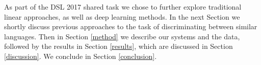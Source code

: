 
As part of the DSL 2017 shared task we chose to further explore traditional linear approaches, as well as deep learning methods. In the next Section we shortly discuss previous approaches to the task of discriminating between similar languages. Then in Section \ref{method} we describe our systems and the data, followed by the results in Section \ref{results}, which are discussed in Section \ref{discussion}. We conclude in Section \ref{conclusion}.












